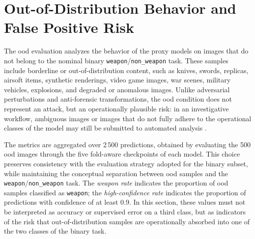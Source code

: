 \section{Out-of-Distribution Behavior and False Positive Risk}
\label{sec:results-ood}

The \gls{ood} evaluation analyzes the behavior of the proxy models on images
that do not belong to the nominal binary
\texttt{weapon}/\texttt{non\_weapon} task. These samples include borderline or
out-of-distribution content, such as knives, swords, replicas, airsoft items,
synthetic renderings, video game images, war scenes, military vehicles,
explosions, and degraded or anomalous images. Unlike adversarial perturbations
and anti-forensic transformations, the \gls{ood} condition does not represent an
attack, but an operationally plausible risk: in an investigative workflow,
ambiguous images or images that do not fully adhere to the operational classes
of the model may still be submitted to automated analysis
\cite{hendrycks2017baseline,liang2018odin,fort2021exploring}.

The metrics are aggregated over 2\,500 predictions, obtained by evaluating the
500 \gls{ood} images through the five fold-aware checkpoints of each model.
This choice preserves consistency with the evaluation strategy adopted for the
binary subset, while maintaining the conceptual separation between \gls{ood}
samples and the \texttt{weapon}/\texttt{non\_weapon} task. The
\emph{weapon rate} indicates the proportion of \gls{ood} samples classified as
\texttt{weapon}; the \emph{high-confidence rate} indicates the proportion of
predictions with confidence of at least 0.9. In this section, these values must
not be interpreted as accuracy or supervised error on a third class, but as
indicators of the risk that out-of-distribution samples are operationally
absorbed into one of the two classes of the binary task.

